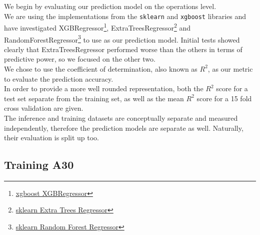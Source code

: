 We begin by evaluating our prediction model on the operations level. \\
We are using the implementations from the \texttt{sklearn} and \texttt{xgboost} libraries and have investigated XGBRegressor\footnote{\href{https://xgboost.readthedocs.io/en/latest/python/index.html}{xgboost XGBRegressor} }, ExtraTreesRegressor\footnote{\href{https://scikit-learn.org/stable/modules/generated/sklearn.ensemble.ExtraTreesRegressor.html}{sklearn Extra Trees Regressor} } and RandomForestRegressor\footnote{\href{https://scikit-learn.org/stable/modules/generated/sklearn.ensemble.RandomForestRegressor.html}{sklearn Random Forest Regressor} } to use as our prediction model. Initial tests showed clearly that ExtraTreesRegressor performed worse than the others in terms of predictive power, so we focused on the other two. \\
We chose to use the coefficient of determination, also known as $R^2$, as our metric to evaluate the prediction accuracy. \\
In order to provide a more well rounded representation, both the $R^2$ score for a test set separate from the training set, as well as the mean $R^2$ score for a 15 fold cross validation are given. \\
The inference and training datasets are conceptually separate and measured independently, therefore the prediction models are separate as well. Naturally, their evaluation is split up too.








\subsection{Training A30}



